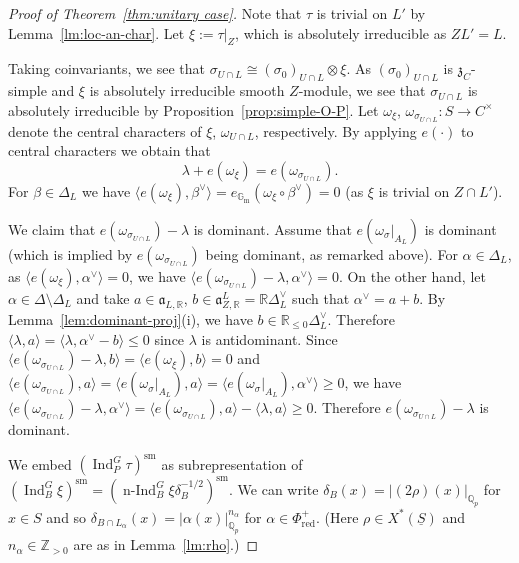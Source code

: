 \documentclass[a4paper]{amsart}
\numberwithin{equation}{section}
\theoremstyle{remark}
\theoremstyle{definition}
\DeclareMathOperator{\Ind}{Ind}
\DeclareMathOperator{\nInd}{n-Ind}
\newcommand{\Z}{\mathbb{Z}}
\newcommand{\Q}{\mathbb{Q}}
\newcommand{\R}{\mathbb{R}}
\newcommand{\sm}{\mathrm{sm}}
\newcommand{\alggrp}[1]{\underline{#1}}
\newcommand{\ang}[1]{\langle #1\rangle}
\begin{document}
\begin{proof}[Proof of Theorem~\ref{thm:unitary case}]
  Note that $\tau$ is trivial on $L'$ by Lemma~\ref{lm:loc-an-char}.
  Let $\xi := \tau|_Z$, which is absolutely irreducible as $ZL' = L$.

  Taking coinvariants, we see that $\sigma_{U \cap L} \cong (\sigma_0)_{U \cap L} \otimes \xi$.   As $(\sigma_{0})_{U\cap L}$ is $\mathfrak{z}_{C}$-simple and $\xi$ is absolutely irreducible smooth $Z$-module, we see that $\sigma_{U\cap L}$ is absolutely irreducible by Proposition~\ref{prop:simple-O-P}.
  Let $\omega_\xi$, $\omega_{\sigma_{U\cap L}} \colon S \to C^{\times}$ denote the central characters of $\xi$, $\omega_{U\cap L}$, respectively.
  By applying $e(\cdot)$ to central characters we obtain that 
  \begin{equation}
    \lambda + e(\omega_\xi) = e(\omega_{\sigma_{U \cap L}}).\label{eq:cc}
  \end{equation}
  For $\beta \in \Delta_L$ we have $\ang{e(\omega_{\xi}),\beta^\vee} = e_{\mathbb{G}_{\mathrm{m}}}(\omega_{\xi}\circ\beta^{\vee}) = 0$ (as $\xi$ is trivial on $Z\cap L'$).
  
  We claim that $e(\omega_{\sigma_{U\cap L}}) - \lambda$ is dominant.
  Assume that $e(\omega_{\sigma}|_{A_{L}})$ is dominant (which is implied by $e(\omega_{\sigma_{U\cap L}})$ being dominant, as remarked above).
  For $\alpha\in\Delta_{L}$, as $\langle e(\omega_{\xi}),\alpha^{\vee}\rangle = 0$, we have $\langle e(\omega_{\sigma_{U\cap L}}) - \lambda,\alpha^{\vee}\rangle = 0$.
  On the other hand, let $\alpha\in\Delta\setminus\Delta_{L}$ and take $a\in \mathfrak{a}_{L,\R}$, $b\in \mathfrak{a}_{Z,\R}^{L} = \R\Delta_{L}^{\vee}$ such that $\alpha^{\vee} = a + b$.
  By Lemma~\ref{lem:dominant-proj}(i), we have $b\in\R_{\le 0}\Delta_{L}^{\vee}$.
  Therefore $\langle \lambda,a\rangle = \langle \lambda,\alpha^{\vee} - b\rangle \le 0$ since $\lambda$ is antidominant.
  Since $\langle e(\omega_{\sigma_{U\cap L}}) - \lambda,b\rangle = \langle e(\omega_{\xi}),b\rangle = 0$ and $\langle e(\omega_{\sigma_{U\cap L}}),a\rangle = \langle e(\omega_{\sigma}|_{A_{L}}),a\rangle = \langle e(\omega_{\sigma}|_{A_{L}}),\alpha^{\vee}\rangle\ge 0$, we have $\langle e(\omega_{\sigma_{U\cap L}}) - \lambda,\alpha^{\vee}\rangle = \langle e(\omega_{\sigma_{U\cap L}}),a\rangle - \langle \lambda,a\rangle\ge 0$.
  Therefore $e(\omega_{\sigma_{U\cap L}}) - \lambda$ is dominant.

  We embed $(\Ind_P^G \tau)^\sm$ as subrepresentation of $(\Ind_B^G \xi)^\sm = (\nInd_B^G \xi \delta_B^{-1/2})^\sm$.
  We can write $\delta_B(x) = \lvert(2\rho)(x)\rvert_{\Q_{p}}$ for $x \in S$ and so $\delta_{B\cap L_{\alpha}}(x) = \lvert\alpha(x)\rvert^{n_\alpha}_{\Q_{p}}$ for $\alpha \in \Phi_{\mathrm{red}}^+$.
  (Here $\rho \in X^*(\alggrp{S})$ and $n_\alpha \in \Z_{> 0}$ are as in Lemma~\ref{lm:rho}.)


\end{proof}
\end{document}
